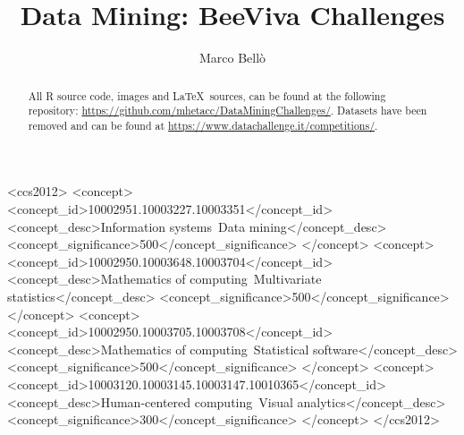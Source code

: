 \documentclass[manuscript,screen,review]{acmart}
\begin{document}
\title{Data Mining: BeeViva Challenges}

\author{Marco Bellò}



\renewcommand{\shortauthors}{Bellò}

\begin{abstract}
All R source code, images and \LaTeX\ sources, can be found at the following repository: \url{https://github.com/mhetacc/DataMiningChallenges/}. Datasets have been removed and can be found at \url{https://www.datachallenge.it/competitions/}.
\end{abstract}
\begin{CCSXML}
<ccs2012>
   <concept>
       <concept_id>10002951.10003227.10003351</concept_id>
       <concept_desc>Information systems~Data mining</concept_desc>
       <concept_significance>500</concept_significance>
       </concept>
   <concept>
       <concept_id>10002950.10003648.10003704</concept_id>
       <concept_desc>Mathematics of computing~Multivariate statistics</concept_desc>
       <concept_significance>500</concept_significance>
       </concept>
   <concept>
       <concept_id>10002950.10003705.10003708</concept_id>
       <concept_desc>Mathematics of computing~Statistical software</concept_desc>
       <concept_significance>500</concept_significance>
       </concept>
   <concept>
       <concept_id>10003120.10003145.10003147.10010365</concept_id>
       <concept_desc>Human-centered computing~Visual analytics</concept_desc>
       <concept_significance>300</concept_significance>
       </concept>
 </ccs2012>
\end{CCSXML}
\end{document}
